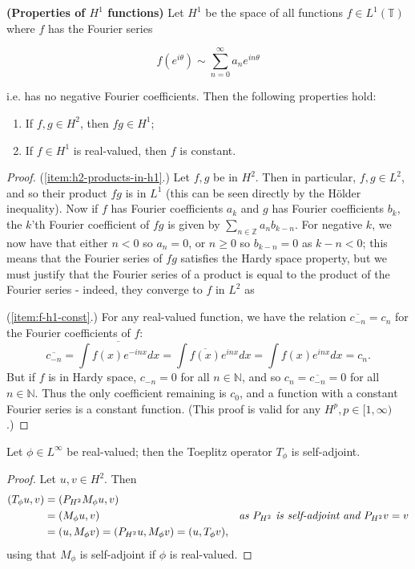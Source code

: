 \documentclass[../main.tex]{subfiles}
\begin{document}
\begin{lemma}{\textbf{(Properties of $H^1$ functions)}}\label{thm:h1-properties}
Let $H^1$ be the space of all functions $f \in L^1(\mathbb{T})$ where $f$ has the Fourier series

$$f(e^{i \theta}) \sim \sum_{n=0}^\infty a_n e^{i n \theta}$$

i.e. has no negative Fourier coefficients. Then the following properties hold:
\begin{enumerate}
\item\label{item:h2-products-in-h1} If $f, g \in H^2$, then $fg \in H^1$;
\item\label{item:f-h1-const} If $f \in H^1$ is real-valued, then $f$ is constant.
\end{enumerate}
\end{lemma}
\begin{proof}
(\ref{item:h2-products-in-h1}.) Let $f, g$ be in $H^2$. Then in particular, $f, g \in L^2$, and so their product $fg$ is in $L^1$ (this can be seen directly by the H\"older inequality). Now if $f$ has Fourier coefficients $a_k$ and $g$ has Fourier coefficients $b_k$, the $k$'th Fourier coefficient of $fg$ is given by $\sum_{n \in \mathbb{Z}} a_n b_{k-n}$. For negative $k$, we now have that either $n < 0$ so $a_n = 0$, or $n \geq 0$ so $b_{k-n} = 0$ as $k-n < 0$;
this means that the Fourier series of $fg$ satisfies the Hardy space property, but we must justify that the Fourier series of a product is equal to the product of the Fourier series - indeed, they converge to $f$ in $L^2$ as 

(\ref{item:f-h1-const}.) For any real-valued function, we have the relation $\overline{c_{-n}} = c_n$ for the Fourier coefficients of $f$:
$$ \overline{c_{-n}} = \overline{\int f(x) e^{-inx} dx} = \int \overline{f(x)} e^{inx} dx = \int f(x) e^{inx} dx = c_n.$$
But if $f$ is in Hardy space, $c_{-n} = 0$ for all $n \in \mathbb{N}$, and so $c_n = \overline{c_{-n}} = 0$ for all $n \in \mathbb{N}$. Thus
the only coefficient remaining is $c_0$, and a function with a constant Fourier series is a constant function. (This proof is valid for any $H^p, p \in [1, \infty)$.)
\end{proof}

\begin{lemma}
Let $\phi \in L^\infty$ be real-valued; then the Toeplitz operator $T_\phi$ is self-adjoint. 
\end{lemma}
\begin{proof}
Let $u, v \in H^2$. Then 
\begin{align*}
(T_\phi u, v) & = ( P_{H^2}M_\phi u, v) & \\
& = (M_\phi u, v) & \text{\emph{as $P_{H^2}$ is self-adjoint and $P_{H^2}v = v$}}\\
& = (u, M_\phi v) = (P_{H^2}u, M_\phi v) = (u, T_\phi v),
\end{align*}
using that $M_\phi$ is self-adjoint if $\phi$ is real-valued.
\end{proof}
\end{document}
